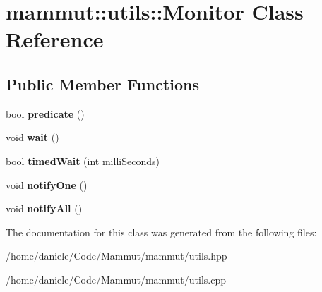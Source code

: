 \hypertarget{classmammut_1_1utils_1_1Monitor}{\section{mammut\-:\-:utils\-:\-:Monitor Class Reference}
\label{classmammut_1_1utils_1_1Monitor}
}
\subsection*{Public Member Functions}
\begin{DoxyCompactItemize}
\item 
\hypertarget{classmammut_1_1utils_1_1Monitor_a85a85bbfb07e362c9a28423583d94bfe}{bool {\bfseries predicate} ()}\label{classmammut_1_1utils_1_1Monitor_a85a85bbfb07e362c9a28423583d94bfe}

\item 
\hypertarget{classmammut_1_1utils_1_1Monitor_a33c69d6e55aaa4a2e0adb02ab343f362}{void {\bfseries wait} ()}\label{classmammut_1_1utils_1_1Monitor_a33c69d6e55aaa4a2e0adb02ab343f362}

\item 
\hypertarget{classmammut_1_1utils_1_1Monitor_ac963272e14f116d05cc8044bb65e2dc5}{bool {\bfseries timed\-Wait} (int milli\-Seconds)}\label{classmammut_1_1utils_1_1Monitor_ac963272e14f116d05cc8044bb65e2dc5}

\item 
\hypertarget{classmammut_1_1utils_1_1Monitor_af5f6ab80d64a1dc5dd1e8297320beb8d}{void {\bfseries notify\-One} ()}\label{classmammut_1_1utils_1_1Monitor_af5f6ab80d64a1dc5dd1e8297320beb8d}

\item 
\hypertarget{classmammut_1_1utils_1_1Monitor_a55f786fc6e3481514b1ee1ce96e06bf2}{void {\bfseries notify\-All} ()}\label{classmammut_1_1utils_1_1Monitor_a55f786fc6e3481514b1ee1ce96e06bf2}

\end{DoxyCompactItemize}


The documentation for this class was generated from the following files\-:\begin{DoxyCompactItemize}
\item 
/home/daniele/\-Code/\-Mammut/mammut/utils.\-hpp\item 
/home/daniele/\-Code/\-Mammut/mammut/utils.\-cpp\end{DoxyCompactItemize}
